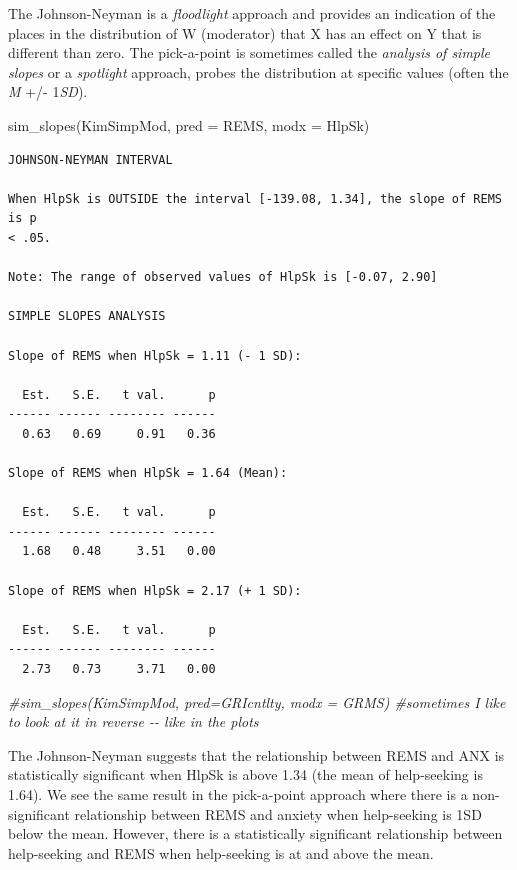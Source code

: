 \documentclass[
  11pt,
]{book}
\newenvironment{Shaded}{\begin{snugshade}}{\end{snugshade}}
\newcommand{\AttributeTok}[1]{\textcolor[rgb]{0.77,0.63,0.00}{#1}}
\newcommand{\CommentTok}[1]{\textcolor[rgb]{0.56,0.35,0.01}{\textit{#1}}}
\newcommand{\FunctionTok}[1]{\textcolor[rgb]{0.00,0.00,0.00}{#1}}
\newcommand{\NormalTok}[1]{#1}
\begin{document}
The Johnson-Neyman is a \emph{floodlight} approach and provides an indication of the places in the distribution of W (moderator) that X has an effect on Y that is different than zero. The pick-a-point is sometimes called the \emph{analysis of simple slopes} or a \emph{spotlight} approach, probes the distribution at specific values (often the \emph{M} +/- 1\emph{SD}).

\begin{Shaded}
\begin{Highlighting}[]
\FunctionTok{sim\_slopes}\NormalTok{(KimSimpMod, }\AttributeTok{pred =}\NormalTok{ REMS, }\AttributeTok{modx =}\NormalTok{ HlpSk)}
\end{Highlighting}
\end{Shaded}

\begin{verbatim}
JOHNSON-NEYMAN INTERVAL 

When HlpSk is OUTSIDE the interval [-139.08, 1.34], the slope of REMS is p
< .05.

Note: The range of observed values of HlpSk is [-0.07, 2.90]

SIMPLE SLOPES ANALYSIS 

Slope of REMS when HlpSk = 1.11 (- 1 SD): 

  Est.   S.E.   t val.      p
------ ------ -------- ------
  0.63   0.69     0.91   0.36

Slope of REMS when HlpSk = 1.64 (Mean): 

  Est.   S.E.   t val.      p
------ ------ -------- ------
  1.68   0.48     3.51   0.00

Slope of REMS when HlpSk = 2.17 (+ 1 SD): 

  Est.   S.E.   t val.      p
------ ------ -------- ------
  2.73   0.73     3.71   0.00
\end{verbatim}

\begin{Shaded}
\begin{Highlighting}[]
\CommentTok{\#sim\_slopes(KimSimpMod, pred=GRIcntlty, modx = GRMS) \#sometimes I like to look at it in reverse {-}{-} like in the plots}
\end{Highlighting}
\end{Shaded}

The Johnson-Neyman suggests that the relationship between REMS and ANX is statistically significant when HlpSk is above 1.34 (the mean of help-seeking is 1.64). We see the same result in the pick-a-point approach where there is a non-significant relationship between REMS and anxiety when help-seeking is 1SD below the mean. However, there is a statistically significant relationship between help-seeking and REMS when help-seeking is at and above the mean.
\end{document}
